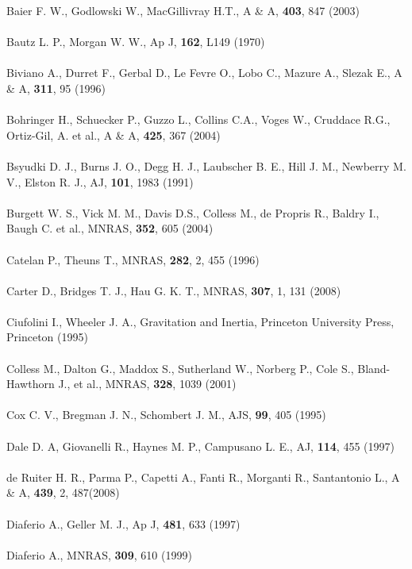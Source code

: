 Baier F. W., Godlowski W., MacGillivray H.T., A \& A, \textbf{403}, 847 (2003)\\\\
Bautz L. P., Morgan W. W., Ap J, \textbf{162}, L149 (1970)\\\\
Biviano A., Durret F., Gerbal D., Le Fevre O., Lobo C., Mazure A., Slezak E., A \& A, \textbf{311}, 95 (1996)\\\\
Bohringer H., Schuecker P., Guzzo L., Collins C.A., Voges W., Cruddace R.G., Ortiz-Gil, A. et al., A \& A, \textbf{425}, 367 (2004)\\\\
Bsyudki D. J., Burns J. O., Degg H. J., Laubscher B. E., Hill J. M., Newberry M. V., Elston R. J., AJ, \textbf{ 101}, 1983 (1991)\\\\
Burgett W. S., Vick M. M., Davis D.S., Colless M., de Propris R., Baldry I., Baugh C. et al., MNRAS, \textbf{352}, 605 (2004)\\\\
Catelan P., Theuns T., MNRAS, \textbf{282}, 2, 455 (1996)\\\\
Carter D., Bridges T. J., Hau G. K. T., MNRAS, \textbf{307},  1, 131 (2008)\\\\
Ciufolini I.,  Wheeler J. A., Gravitation and Inertia, Princeton University Press, Princeton (1995)\\\\
Colless M., Dalton G., Maddox S., Sutherland W., Norberg P., Cole S., Bland-Hawthorn J., et al., MNRAS, \textbf{328}, 1039 (2001)\\\\
Cox C. V., Bregman J. N., Schombert J. M., AJS, \textbf{99}, 405 (1995)\\\\
Dale D. A, Giovanelli R., Haynes M. P., Campusano L. E., AJ, \textbf{114}, 455 (1997)\\\\
de Ruiter H. R., Parma P., Capetti A., Fanti R., Morganti R., Santantonio L., A \& A, \textbf{ 439},  2, 487(2008)\\\\
Diaferio A., Geller M. J., Ap J, \textbf{481}, 633 (1997)\\\\
Diaferio A., MNRAS, \textbf{309}, 610 (1999)\\\\
